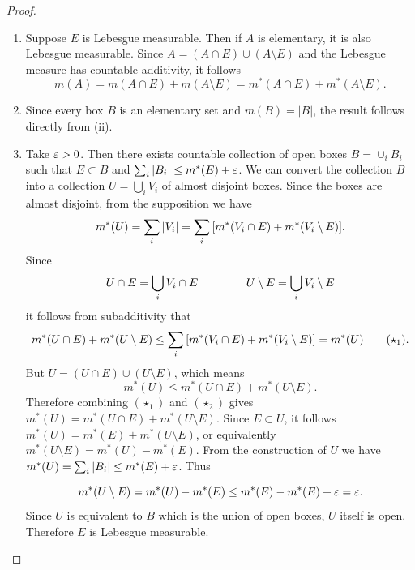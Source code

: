 \documentclass[hw_all.tex]{subfiles}
\begin{document}
\begin{proof}
    \begin{enumerate}
        \item[i $\Rightarrow$ ii)]
            Suppose $E$ is Lebesgue measurable. Then if $A$ is elementary, it is also Lebesgue measurable. Since $A = (A \cap E) \cup (A \setminus E)$ and the Lebesgue measure has countable additivity, it follows
            \[
                m(A) = m(A \cap E) + m(A \setminus E) = m^*(A \cap E) + m^*(A \setminus E)
            .\]

        \item[ii $\Rightarrow$ iii)]
            Since every box $B$ is an elementary set and $m(B) = |B|$, the result follows directly from (ii).
            
        \item[iii $\Rightarrow$ i)]
            Take $\varepsilon > 0$. Then there exists countable collection of open boxes $B = \cup_{i} B_i$ such that $E \subset B$ and $\sum_i |B_i| \leq m^*(E) + \varepsilon$. We can convert the collection $B$ into a collection $U = \bigcup_i V_i$ of almost disjoint boxes. 
            Since the boxes are almost disjoint, from the supposition we have
            \[
                m^*(U) = \sum_i |V_i| = \sum_i \qty[m^*(V_i \cap E) + m^*(V_i \setminus E)]
            .\]
            Since
            \[
                U \cap E = \bigcup_i V_i \cap E \hspace{1.5cm} U \setminus E = \bigcup_i V_i \setminus E
            \]
            it follows from subadditivity that
            \[
                m^*(U \cap E) + m^*(U \setminus E) \leq \sum_i \qty[m^*(V_i \cap E) + m^*(V_i \setminus E)] = m^*(U) \tag{$\star_1$}
            .\]
            But $U = (U \cap E) \cup (U \setminus E)$, which means
            \[
                m^*(U) \leq m^*(U \cap E) + m^*(U \setminus E) \tag{$\star_2$}
            .\]
            Therefore combining $(\star_1)$ and $(\star_2)$ gives $m^*(U) = m^*(U \cap E) + m^*(U \setminus E)$. Since $E \subset U$, it follows $m^*(U) = m^*(E) + m^*(U \setminus E)$, or equivalently $m^*(U \setminus E) = m^*(U) - m^*(E)$. From the construction of $U$ we have $m^*(U) = \sum_{i} |B_i| \leq m^*(E) + \varepsilon$. Thus

            \[
                m^*(U \setminus E) = m^*(U) - m^*(E) \leq m^*(E) - m^*(E) + \varepsilon = \varepsilon
            .\]
            Since $U$ is equivalent to $B$ which is the union of open boxes, $U$ itself is open. Therefore $E$ is Lebesgue measurable.
   \end{enumerate}
\end{proof}
\end{document}
